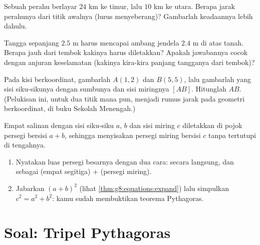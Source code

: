 \begin{exercise}[$\star\star$]\label{exo:g8:pythagoras:8}
Sebuah perahu berlayar $24$ km ke timur, lalu $10$ km ke utara.
Berapa jarak perahunya dari titik awalnya (lurus menyeberang)?
Gambarlah keadaannya lebih dahulu.
\end{exercise}

\begin{exercise}[$\star\star$]\label{exo:g8:pythagoras:9}
Tangga sepanjang $2.5$ m harus mencapai ambang jendela $2.4$ m di atas
tanah. Berapa jauh dari tembok kakinya harus diletakkan? Apakah
jawabannya cocok dengan anjuran keselamatan (kakinya kira-kira
 panjang tangganya dari tembok)?
\end{exercise}

\begin{exercise}[$\star\star$]\label{exo:g8:pythagoras:10}
Pada kisi berkoordinat, gambarlah $A(1, 2)$ dan $B(5, 5)$, lalu
gambarlah  yang sisi siku-sikunya  dengan
sumbunya dan sisi miringnya $[AB]$. Hitunglah $AB$. (Pelukisan ini,
untuk dua titik mana pun, menjadi rumus jarak pada geometri
berkoordinat, di buku Sekolah Menengah.)
\end{exercise}

\begin{exercise}[$\star\star\star$]\label{exo:g8:pythagoras:11}
Empat salinan  dengan sisi siku-siku $a$, $b$ dan
sisi miring $c$ diletakkan di pojok persegi bersisi $a + b$, sehingga
menyisakan persegi miring bersisi $c$ tanpa tertutupi di tengahnya.
\begin{enumerate}
  \item Nyatakan luas persegi besarnya dengan dua cara: secara
        langsung, dan sebagai (empat segitiga) $+$ (persegi miring).
  \item Jabarkan $(a + b)^2$ (lihat \cref{thm:g8:equations:expand})
        lalu simpulkan $c^2 = a^2 + b^2$: kamu sudah membuktikan
        teorema Pythagoras.
\end{enumerate}
\end{exercise}

\section{Soal: Tripel Pythagoras}

